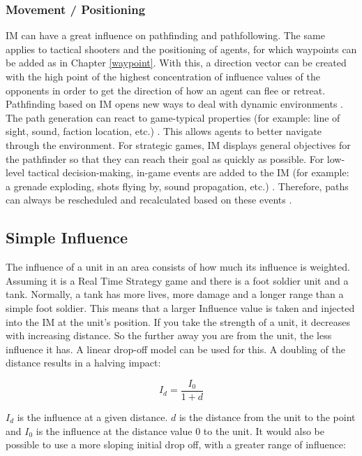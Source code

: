\documentclass[]{report}
\begin{document}
	\subsubsection{Movement / Positioning} 
	\label{pathfinding}
	\ac{IM} can have a great influence on pathfinding and pathfollowing. The same applies to tactical shooters and the positioning of agents, for which waypoints can be added as in Chapter  \ref{waypoint}.
	With this, a direction vector can be created with the high point of the highest concentration of influence values of the opponents in order to get the direction of how an agent can flee or retreat. \newline \newline
	Pathfinding based on \ac{IM} opens new ways to deal with dynamic environments \citep{imPathfinding}. The path generation can react to game-typical properties (for example: line of sight, sound, faction location, etc.) \citep{imPathfinding}. This allows agents to better navigate through the environment. For  strategic games, IM displays general objectives for the pathfinder so that they can reach their goal as quickly as possible. For low-level tactical decision-making, in-game events are added to the \ac{IM} (for example: a grenade exploding, shots flying by, sound propagation, etc.) \citep{imPathfinding}. Therefore, paths can always be rescheduled and recalculated based on these events \citep{imPathfinding}. 
	
	
	\subsection{Simple Influence} \label{ssec:num2}
	The influence of a unit in an area consists of how much its influence is weighted. Assuming it is a Real Time Strategy game and there is a foot soldier unit and a tank. Normally, a tank has more lives, more damage and a longer range than a simple foot soldier. This means that a larger Influence value is taken and injected into the \ac{IM} at the unit's position. If you take the strength of a unit, it decreases with increasing distance. So the further away you are from the unit, the less influence it has. A linear drop-off model can be used for this. A doubling of the distance results in a halving impact:
	
	\begin{equation}
		I_{d} = \frac{I_{0}}{1 + d}
	\end{equation}

	
	$I_{d}$ is the influence at a given distance. $d$ is the distance from the unit to the point and $I_{0}$ is the influence at the distance value 0 to the unit. It would also be possible to use a more sloping initial drop off, with a greater range of influence:
	
\end{document}

